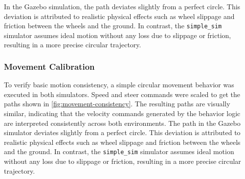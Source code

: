 In the Gazebo simulation, the path deviates slightly from a perfect circle. This deviation is attributed to realistic physical effects such as wheel slippage and friction between the wheels and the ground. In contrast, the \texttt{simple\_sim} simulator assumes ideal motion without any loss due to slippage or friction, resulting in a more precise circular trajectory.

\subsubsection{Movement Calibration}
To verify basic motion consistency, a simple circular movement behavior was executed in both simulators. Speed and steer commands were scaled to get the paths shown in \cref{fig:movement-consistency}. The resulting paths are visually similar, indicating that the velocity commands generated by the behavior logic are interpreted consistently across both environments. The path in the Gazebo simulator deviates slightly from a perfect circle. This deviation is attributed to realistic physical effects such as wheel slippage and friction between the wheels and the ground. In contrast, the \texttt{simple\_sim} simulator assumes ideal motion without any loss due to slippage or friction, resulting in a more precise circular trajectory.

